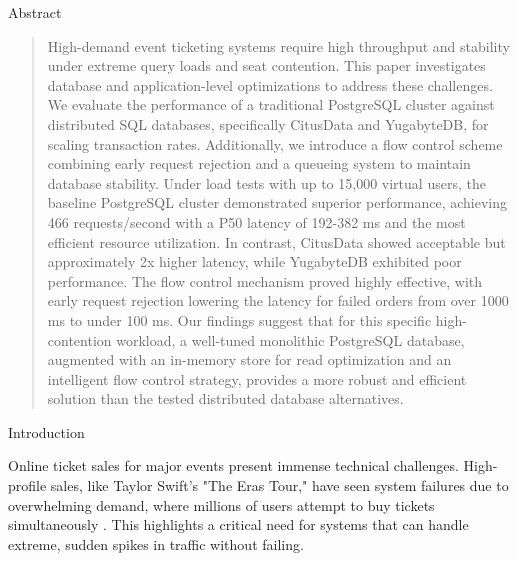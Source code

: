 \documentclass[a0,landscape]{config/poster/a0poster}
\newcommand{\postersection}[1]{%
  \begin{tcolorbox}[
    colback=IEEEblue,
    colframe=IEEEblue,
    fonttitle=\bfseries,
    coltext=white,
    sharp corners,
    boxrule=0pt,
    top=4pt,
    bottom=4pt,
    halign=center
  ]
    \large #1
  \end{tcolorbox}%
}
\begin{document}
\begin{multicols}{4} %


    \postersection{Abstract}
    \begin{quote}
        High-demand event ticketing systems require high throughput and stability under extreme query loads and seat contention. This paper investigates database and application-level optimizations to address these challenges. We evaluate the performance of a traditional PostgreSQL cluster against distributed SQL databases, specifically CitusData and YugabyteDB, for scaling transaction rates. Additionally, we introduce a flow control scheme combining early request rejection and a queueing system to maintain database stability. Under load tests with up to 15,000 virtual users, the baseline PostgreSQL cluster demonstrated superior performance, achieving 466 requests/second with a P50 latency of 192-382 ms and the most efficient resource utilization. In contrast, CitusData showed acceptable but approximately 2x higher latency, while YugabyteDB exhibited poor performance. The flow control mechanism proved highly effective, with early request rejection lowering the latency for failed orders from over 1000 ms to under 100 ms. Our findings suggest that for this specific high-contention workload, a well-tuned monolithic PostgreSQL database, augmented with an in-memory store for read optimization and an intelligent flow control strategy, provides a more robust and efficient solution than the tested distributed database alternatives.
    \end{quote}


    \postersection{Introduction}
    Online ticket sales for major events present immense technical challenges. High-profile sales, like Taylor Swift's "The Eras Tour," have seen system failures due to overwhelming demand, where millions of users attempt to buy tickets simultaneously \cite{swiftTicketmaster}. This highlights a critical need for systems that can handle extreme, sudden spikes in traffic without failing.


\end{multicols}
\end{document}
